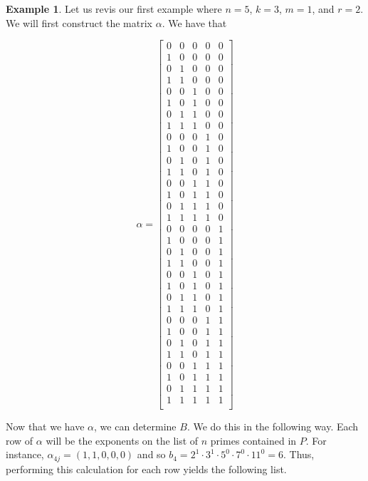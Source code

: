 \documentclass{article}
\theoremstyle{definition}
\theoremstyle{remark}
\theoremstyle{definition}
\newtheorem{example}{Example}[section]
\begin{document}
\begin{example}
    Let us revis our first example where $n=5$, $k=3$, $m=1$, and $r=2$. We will first construct the matrix $\alpha$. We have that
    
    \begin{equation*} \alpha =
        \begin{bmatrix} 0&0&0&0&0 \\ 1&0&0&0&0 \\ 0&1&0&0&0 \\ 1&1&0&0&0 \\ 0&0&1&0&0 \\ 1&0&1&0&0 \\ 0&1&1&0&0 \\ 1&1&1&0&0 \\ 0&0&0&1&0  \\ 1&0&0&1&0 \\ 0&1&0&1&0 \\ 1&1&0&1&0 \\ 0&0&1&1&0 \\ 1&0&1&1&0 \\ 0&1&1&1&0 \\ 1&1&1&1&0 \\ 0&0&0&0&1 \\ 1&0&0&0&1 \\ 0&1&0&0&1 \\ 1&1&0&0&1 \\ 0&0&1&0&1 \\ 1&0&1&0&1 \\ 0&1&1&0&1 \\ 1&1&1&0&1 \\ 0&0&0&1&1 \\ 1&0&0&1&1 \\ 0&1&0&1&1 \\ 1&1&0&1&1 \\ 0&0&1&1&1 \\ 1&0&1&1&1 \\ 0&1&1&1&1 \\ 1&1&1&1&1\\\end{bmatrix}
    \end{equation*}
    
    \noindent Now that we have $\alpha$, we can determine $B$. We do this in the following way. Each row of $\alpha$ will be the exponents on the list of $n$ primes contained in $P$. For instance, $\alpha_{4j}=(1,1,0,0,0)$ and so $b_4=2^1\cdot3^1\cdot5^0\cdot7^0\cdot11^0=6$. Thus, performing this calculation for each row yields the following list.
    

\end{example}
\end{document}
